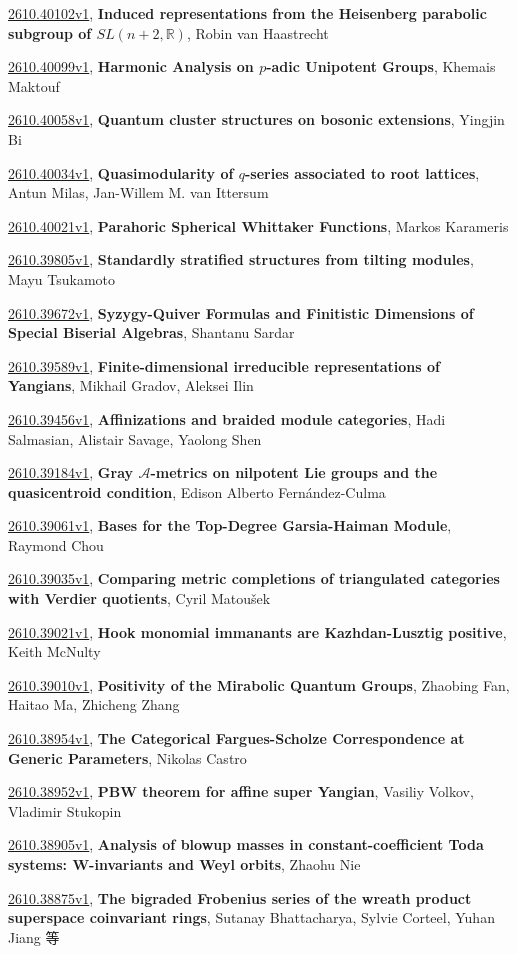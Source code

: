 \documentclass[9pt, a4paper]{article}
\theoremstyle{plain}
\theoremstyle{definition}
\theoremstyle{remark}
\newcommand{\arxiv}[3]{\href{https://arxiv.org/abs/#1}{#1}, \textbf{\textcolor{arxivblue}{#2}}, #3}
\begin{document}
\arxiv{2610.40102v1}{Induced representations from the Heisenberg parabolic subgroup of $SL(n+2,\mathbb{R})$}{Robin van Haastrecht}

\arxiv{2610.40099v1}{Harmonic Analysis on $p$-adic Unipotent Groups}{Khemais Maktouf}

\arxiv{2610.40058v1}{Quantum cluster structures on bosonic extensions}{Yingjin Bi}

\arxiv{2610.40034v1}{Quasimodularity of $q$-series associated to root lattices}{Antun Milas, Jan-Willem M. van Ittersum}

\arxiv{2610.40021v1}{Parahoric Spherical Whittaker Functions}{Markos Karameris}

\arxiv{2610.39805v1}{Standardly stratified structures from tilting modules}{Mayu Tsukamoto}

\arxiv{2610.39672v1}{Syzygy-Quiver Formulas and Finitistic Dimensions of Special Biserial Algebras}{Shantanu Sardar}

\arxiv{2610.39589v1}{Finite-dimensional irreducible representations of Yangians}{Mikhail Gradov, Aleksei Ilin}

\arxiv{2610.39456v1}{Affinizations and braided module categories}{Hadi Salmasian, Alistair Savage, Yaolong Shen}

\arxiv{2610.39184v1}{Gray $\mathcal{A}$-metrics on nilpotent Lie groups and the quasicentroid condition}{Edison Alberto Fernández-Culma}

\arxiv{2610.39061v1}{Bases for the Top-Degree Garsia-Haiman Module}{Raymond Chou}

\arxiv{2610.39035v1}{Comparing metric completions of triangulated categories with Verdier quotients}{Cyril Matoušek}

\arxiv{2610.39021v1}{Hook monomial immanants are Kazhdan-Lusztig positive}{Keith McNulty}

\arxiv{2610.39010v1}{Positivity of the Mirabolic Quantum Groups}{Zhaobing Fan, Haitao Ma, Zhicheng Zhang}

\arxiv{2610.38954v1}{The Categorical Fargues-Scholze Correspondence at Generic Parameters}{Nikolas Castro}

\arxiv{2610.38952v1}{PBW theorem for affine super Yangian}{Vasiliy Volkov, Vladimir Stukopin}

\arxiv{2610.38905v1}{Analysis of blowup masses in constant-coefficient Toda systems: W-invariants and Weyl orbits}{Zhaohu Nie}

\arxiv{2610.38875v1}{The bigraded Frobenius series of the wreath product superspace coinvariant rings}{Sutanay Bhattacharya, Sylvie Corteel, Yuhan Jiang 等}
\end{document}
